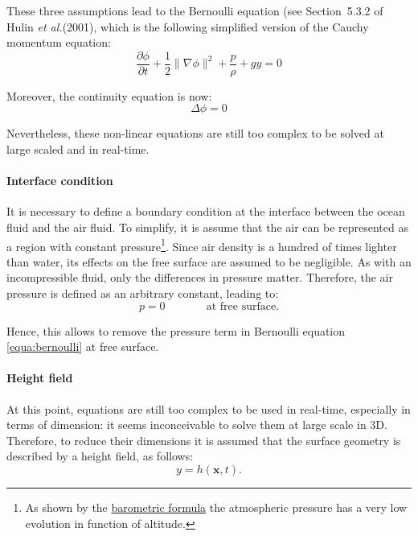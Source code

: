 \documentclass[final]{jcgt}
\def\etal{\emph{et al.}\xspace}
\begin{document}
These three assumptions lead to the Bernoulli equation (see Section~5.3.2 of Hulin \etal (2001), which is the following simplified version of the Cauchy momentum equation:
\begin{equation}
	\frac{\partial \phi}{\partial t} + \frac{1}{2}\|\nabla\phi\|^2 + \frac{p}{\rho} + gy = 0
	\label{equa:bernoulli}
\end{equation}

Moreover, the continuity equation is now:
\begin{equation}
	\Delta \phi = 0 \label{equa:continuityS}
\end{equation}

Nevertheless, these non-linear equations are still too complex to be solved at large scaled and in real-time.

\paragraph{Interface condition}
It is necessary to define a boundary condition at the interface between the ocean fluid and the air fluid.
To simplify, it is assume that the air can be represented as a region with constant pressure\footnote{As shown by the \href{https://en.wikipedia.org/wiki/Barometric_formula}{barometric formula} the atmospheric pressure has a very low evolution in function of altitude.}.
Since air density is a hundred of times lighter than water, its effects on the free surface are assumed to be negligible.
As with an incompressible fluid, only the differences in pressure matter.
Therefore, the air pressure is defined as an arbitrary constant, leading to:
\begin{equation}
	p = 0\text{~~~~~~~~~~~at free surface.}
\end{equation}

Hence, this allows to remove the pressure term in Bernoulli equation \ref{equa:bernoulli} at free surface.

\paragraph{Height field}
At this point, equations are still too complex to be used in real-time, especially in terms of dimension:
it seems inconceivable to solve them at large scale in 3D.
Therefore, to reduce their dimensions it is assumed that the surface geometry is described by a height field, as follows:
\begin{equation}
	y = h(\mathbf x, t).
\end{equation}
\end{document}
